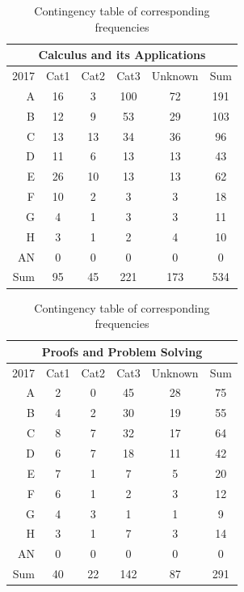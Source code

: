 \documentclass[a4paper]{report}
\begin{document}
\begin{table}[H]
  \centering
  \begin{tabular}{r|cccc|c}
    \hline
    \multicolumn{6}{c}{\textbf{Calculus and its Applications}} \\
    \hline
   2017 & Cat1 & Cat2 & Cat3 & Unknown & Sum \\ 
    \hline
  A & 16 & 3 & 100 & 72 & 191 \\ 
    B & 12 & 9 & 53 & 29 & 103 \\ 
    C & 13 & 13 & 34 & 36 & 96 \\ 
    D & 11 & 6 & 13 & 13 & 43 \\ 
    E & 26 & 10 & 13 & 13 & 62 \\ 
    F & 10 & 2 & 3 & 3 & 18 \\ 
    G & 4 & 1 & 3 & 3 & 11 \\ 
    H & 3 & 1 & 2 & 4 & 10 \\ 
    AN & 0 & 0 & 0 & 0 & 0 \\ 
    \hline
    Sum & 95 & 45 & 221 & 173 & 534 \\ 
     \hline
  \end{tabular}
  \caption{\label{tab:REL_CAPGrade_vs_Qual}Contingency table of corresponding frequencies}
\end{table}

\begin{table}[H]
  \centering
  \begin{tabular}{r|cccc|c}
    \hline
    \multicolumn{6}{c}{\textbf{Proofs and Problem Solving}} \\
    \hline
   2017 & Cat1 & Cat2 & Cat3 & Unknown & Sum \\ 
    \hline
  A & 2 & 0 & 45 & 28 & 75 \\ 
    B & 4 & 2 & 30 & 19 & 55 \\ 
    C & 8 & 7 & 32 & 17 & 64 \\ 
    D & 6 & 7 & 18 & 11 & 42 \\ 
    E & 7 & 1 & 7 & 5 & 20 \\ 
    F & 6 & 1 & 2 & 3 & 12 \\ 
    G & 4 & 3 & 1 & 1 & 9 \\ 
    H & 3 & 1 & 7 & 3 & 14 \\ 
    AN & 0 & 0 & 0 & 0 & 0 \\ 
    \hline
    Sum & 40 & 22 & 142 & 87 & 291 \\ 
     \hline
  \end{tabular}
  \caption{\label{tab:REL_PPSGrade_vs_Qual}Contingency table of corresponding frequencies}
\end{table}
\end{document}
